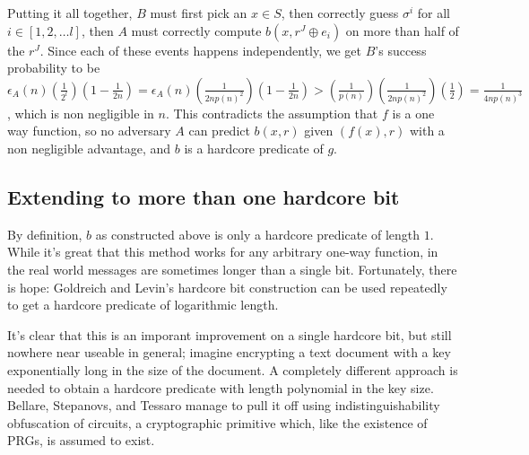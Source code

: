 Putting it all together, \(B\) must first pick an \(x \in S\), then
correctly guess \(\sigma^i\) for all \(i \in [1, 2, \dots l]\), then
\(A\) must correctly compute \(b(x, r^J \oplus e_i)\) on more than half
of the \(r^J\). Since each of these events happens independently, we get
\(B\)'s success probability to be
\(\epsilon_A(n) (\tfrac{1}{2^l})(1 - \tfrac{1}{2n}) = \epsilon_A(n) (\tfrac{1}{2n p(n)^2}) ( 1 - \tfrac{1}{2n}) > (\tfrac{1}{p(n)})(\tfrac{1}{2np(n)^2})(\tfrac{1}{2}) = \tfrac{1}{4n p(n)^3}\),
which is non negligible in \(n\). This contradicts the assumption that
\(f\) is a one way function, so no adversary \(A\) can predict
\(b(x, r)\) given \((f(x), r)\) with a non negligible advantage, and
\(b\) is a hardcore predicate of \(g\).

\subsection{Extending to more than one hardcore
bit}\label{10-Extending-to-more-than}

By definition, \(b\) as constructed above is only a hardcore predicate
of length \(1\). While it's great that this method works for any
arbitrary one-way function, in the real world messages are sometimes
longer than a single bit. Fortunately, there is hope: Goldreich and
Levin's hardcore bit construction can be used repeatedly to get a
hardcore predicate of logarithmic length.

\hypertarget{LogHCBthm}{}

It's clear that this is an imporant improvement on a single hardcore
bit, but still nowhere near useable in general; imagine encrypting a
text document with a key exponentially long in the size of the document.
A completely different approach is needed to obtain a hardcore predicate
with length polynomial in the key size. Bellare, Stepanovs, and Tessaro
manage to pull it off using indistinguishability obfuscation of
circuits, a cryptographic primitive which, like the existence of PRGs,
is assumed to exist.

